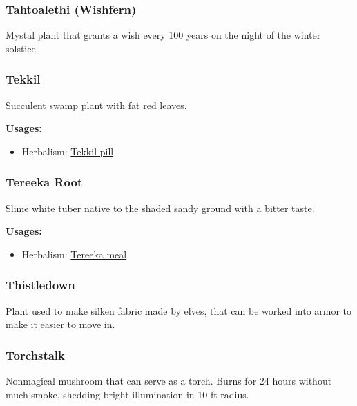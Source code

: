 \subsubsection{Tahtoalethi (Wishfern)}

Mystal plant that grants a wish every 100 years on the night of the winter solstice.

\subsubsection{Tekkil}
\label{Tekkil}

Succulent swamp plant with fat red leaves.

\vspace{5mm}

\textbf{Usages:}

\begin{itemize}[noitemsep]
\item[] Herbalism: \hyperref[Tekkil pill]{Tekkil pill}
\end{itemize}

\subsubsection{Tereeka Root}
\label{Tereeka Root}

Slime white tuber native to the shaded sandy ground with a bitter taste.

\vspace{5mm}

\textbf{Usages:}

\begin{itemize}[noitemsep]
\item[] Herbalism: \hyperref[Tereeka meal]{Tereeka meal}
\end{itemize}

\subsubsection{Thistledown}

Plant used to make silken fabric made by elves, that can be worked into armor to make it easier to move in.

\subsubsection{Torchstalk}

Nonmagical mushroom that can serve as a torch. Burns for 24 hours without much smoke, shedding bright illumination in 10 ft radius.

